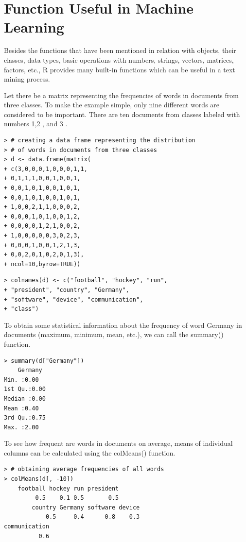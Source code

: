 \documentclass[11pt,openany,executivepaper]{book}
\begin{document}
\section{Function Useful in Machine Learning}
Besides the functions that have been mentioned in relation with objects, their classes, data types, basic operations with numbers, strings, vectors, matrices, factors, etc., R provides many built-in functions which can be useful in a text mining process.

Let there be a matrix representing the frequencies of words in documents from three classes. To make the example simple, only nine different words are considered to be important. There are ten documents from classes labeled with numbers 1,2 , and 3 .

\begin{verbatim}
> # creating a data frame representing the distribution
> # of words in documents from three classes
> d <- data.frame(matrix(
+ c(3,0,0,0,1,0,0,0,1,1,
+ 0,1,1,1,0,0,1,0,0,1,
+ 0,0,1,0,1,0,0,1,0,1,
+ 0,0,1,0,1,0,0,1,0,1,
+ 1,0,0,2,1,1,0,0,0,2,
+ 0,0,0,1,0,1,0,0,1,2,
+ 0,0,0,0,1,2,1,0,0,2,
+ 1,0,0,0,0,0,3,0,2,3,
+ 0,0,0,1,0,0,1,2,1,3,
+ 0,0,2,0,1,0,2,0,1,3),
+ ncol=10,byrow=TRUE))
\end{verbatim}

\begin{verbatim}
> colnames(d) <- c("football", "hockey", "run",
+ "president", "country", "Germany",
+ "software", "device", "communication",
+ "class")
\end{verbatim}

To obtain some statistical information about the frequency of word Germany in documents (maximum, minimum, mean, etc.), we can call the summary() function.

\begin{verbatim}
> summary(d["Germany"])
    Germany
Min. :0.00
1st Qu.:0.00
Median :0.00
Mean :0.40
3rd Qu.:0.75
Max. :2.00
\end{verbatim}

To see how frequent are words in documents on average, means of individual columns can be calculated using the colMeans() function.
\clearpage
\begin{verbatim}
> # obtaining average frequencies of all words
> colMeans(d[, -10])
    football hockey run president
         0.5    0.1 0.5       0.5
        country Germany software device
            0.5     0.4      0.8    0.3
communication
          0.6
\end{verbatim}
\end{document}
